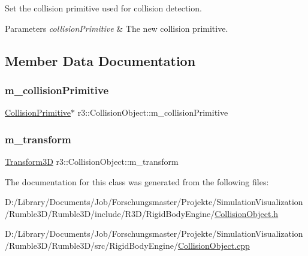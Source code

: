 Set the collision primitive used for collision detection. 


\begin{DoxyParams}{Parameters}
{\em collision\+Primitive} & The new collision primitive. \\
\hline
\end{DoxyParams}


\subsection{Member Data Documentation}
\mbox{\label{classr3_1_1_collision_object_afa62ecdda20144d43f9fcf72d56642d6}} 
\subsubsection{\texorpdfstring{m\+\_\+collision\+Primitive}{m\_collisionPrimitive}}
{\footnotesize\ttfamily \mbox{\hyperlink{classr3_1_1_collision_primitive}{Collision\+Primitive}}$\ast$ r3\+::\+Collision\+Object\+::m\+\_\+collision\+Primitive\hspace{0.3cm}{\ttfamily [protected]}}

\mbox{\label{classr3_1_1_collision_object_a2ed717150a250f1b81e23ba7e5431542}} 
\subsubsection{\texorpdfstring{m\+\_\+transform}{m\_transform}}
{\footnotesize\ttfamily \mbox{\hyperlink{classr3_1_1_transform3_d}{Transform3D}} r3\+::\+Collision\+Object\+::m\+\_\+transform\hspace{0.3cm}{\ttfamily [protected]}}



The documentation for this class was generated from the following files\+:\begin{DoxyCompactItemize}
\item 
D\+:/\+Library/\+Documents/\+Job/\+Forschungsmaster/\+Projekte/\+Simulation\+Visualization/\+Rumble3\+D/\+Rumble3\+D/include/\+R3\+D/\+Rigid\+Body\+Engine/\mbox{\hyperlink{_collision_object_8h}{Collision\+Object.\+h}}\item 
D\+:/\+Library/\+Documents/\+Job/\+Forschungsmaster/\+Projekte/\+Simulation\+Visualization/\+Rumble3\+D/\+Rumble3\+D/src/\+Rigid\+Body\+Engine/\mbox{\hyperlink{_collision_object_8cpp}{Collision\+Object.\+cpp}}\end{DoxyCompactItemize}
